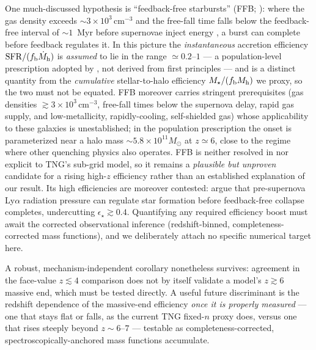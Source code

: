 \documentclass[twocolumn]{aastex631}
\begin{document}
One much-discussed hypothesis is ``feedback-free starbursts'' (FFB; \citealt{dekel23}): where the gas density exceeds $\sim3\times10^{3}\,\mathrm{cm^{-3}}$ and the free-fall time falls below the feedback-free interval of $\sim1$~Myr before supernovae inject energy \citep{dekel23}, a burst can complete before feedback regulates it. In this picture the \emph{instantaneous} accretion efficiency $\mathrm{SFR}/(f_{\rm b}\dot M_{\rm h})$ is \emph{assumed} to lie in the range $\simeq0.2$--$1$ --- a population-level prescription adopted by \citet{li24}, not derived from first principles --- and is a distinct quantity from the \emph{cumulative} stellar-to-halo efficiency $M_\star/(f_{\rm b}M_{\rm h})$ we proxy, so the two must not be equated. FFB moreover carries stringent prerequisites (gas densities $\gtrsim3\times10^{3}\,\mathrm{cm^{-3}}$, free-fall times below the supernova delay, rapid gas supply, and low-metallicity, rapidly-cooling, self-shielded gas) whose applicability to these galaxies is unestablished; in the \citet{li24} population prescription the onset is parameterized near a halo mass $\sim5.8\times10^{11}M_\odot$ at $z\simeq6$, close to the regime where other quenching physics also operates. FFB is neither resolved in nor explicit to TNG's sub-grid model, so it remains a \emph{plausible but unproven} candidate for a rising high-$z$ efficiency rather than an established explanation of our result. Its high efficiencies are moreover contested: \citet{ferrara25} argue that pre-supernova Ly$\alpha$ radiation pressure can regulate star formation before feedback-free collapse completes, undercutting $\epsilon_\star\gtrsim0.4$. Quantifying any required efficiency boost must await the corrected observational inference (redshift-binned, completeness-corrected mass functions), and we deliberately attach no specific numerical target here.

A robust, mechanism-independent corollary nonetheless survives: agreement in the face-value $z\lesssim4$ comparison does not by itself validate a model's $z\gtrsim6$ massive end, which must be tested directly. A useful future discriminant is the redshift dependence of the massive-end efficiency \emph{once it is properly measured} --- one that stays flat or falls, as the current TNG fixed-$n$ proxy does, versus one that rises steeply beyond $z\sim6$--$7$ --- testable as completeness-corrected, spectroscopically-anchored mass functions accumulate.
\end{document}
